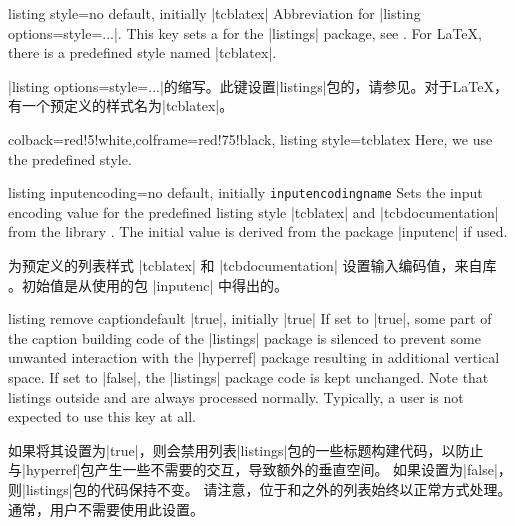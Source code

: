 \begin{docTcbKey}{listing style}{=}{no default, initially |tcblatex|}
Abbreviation for |listing options={style=...}|. This key sets a 
for the |listings| package, see .
For \LaTeX, there is a predefined style named |tcblatex|.

|listing options={style=...}|的缩写。此键设置|listings|包的，请参见。对于\LaTeX，有一个预定义的样式名为|tcblatex|。
\begin{dispExample}
\begin{tcblisting}{colback=red!5!white,colframe=red!75!black,
listing style=tcblatex}
Here, we use the predefined style.
\end{tcblisting}
\end{dispExample}
\end{docTcbKey}

\begin{docTcbKey}{listing inputencoding}{=}{no default, initially \texttt{\cs inputencodingname}}
Sets the input encoding value for the predefined listing style |tcblatex|
and |tcbdocumentation| from the library .
The initial value is derived from the package |inputenc| if used.

为预定义的列表样式 |tcblatex| 和 |tcbdocumentation| 设置输入编码值，来自库 。初始值是从使用的包 |inputenc| 中得出的。
\end{docTcbKey}

\begin{docTcbKey}{listing remove caption}{}{default |true|, initially |true|}
If set to |true|, some part of the caption building code of the |listings| package
is silenced to prevent some unwanted interaction with the |hyperref| package resulting
in additional vertical space.
If set to |false|, the |listings| package code is kept unchanged.
Note that listings outside  and
 are always processed normally.
Typically, a user is not expected to use this key at all.

如果将其设置为|true|，则会禁用列表|listings|包的一些标题构建代码，以防止与|hyperref|包产生一些不需要的交互，导致额外的垂直空间。 如果设置为|false|，则|listings|包的代码保持不变。 请注意，位于和之外的列表始终以正常方式处理。 通常，用户不需要使用此设置。
\end{docTcbKey}

